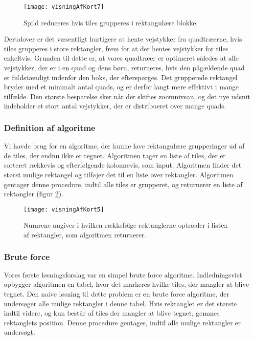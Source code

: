 \begin{figure}[h]
	\centering
	\texttt{[image: visningAfKort7]}
	\captionsetup{width=0.8\textwidth}
	\caption{Spild reduceres hvis tiles grupperes i rektangulære blokke.}
	\label{figur:visningAfKort7}
\end{figure}

Derudover er det væsentligt hurtigere at hente vejstykker fra quadtræerne, hvis tiles grupperes i store rektangler, frem for at der hentes vejstykker for tiles enkeltvis. Grunden til dette er, at vores quadtræer er optimeret således at alle vejstykker, der er i en quad og dens børn, returneres, hvis den pågældende quad er fuldstændigt indenfor den boks, der efterspørges. Det grupperede rektangel bryder med et minimalt antal quads, og er derfor langt mere effektivt i mange tilfælde. Den største besparelse sker når der skiftes zoomniveau, og det nye udsnit indeholder et stort antal vejstykker, der er distribueret over mange quads.

\subsubsection{Definition af algoritme}
\label{subsec:definitionAfAlgoritme}

Vi havde brug for en algoritme, der kunne lave rektangulære grupperinger ud af de tiles, der endnu ikke er tegnet. Algoritmen tager en liste af tiles, der er sorteret rækkevis og efterfølgende kolonnevis, som input. Algoritmen finder det størst mulige rektangel og tilføjer det til en liste over rektangler. Algoritmen gentager denne procedure, indtil alle tiles er grupperet, og returnerer en liste af rektangler (figur \ref{figur:visningAfKort5}).

\begin{figure}[h]
	\centering
	\texttt{[image: visningAfKort5]}
	\captionsetup{width=0.8\textwidth}
	\caption{Numrene angiver i hvilken rækkefølge rektanglerne optræder i listen af rektangler, som algoritmen returnerer.}
	\label{figur:visningAfKort5}
\end{figure}

\subsubsection{Brute force}
\label{subsec:bruteForce}

Vores første løsningsforslag var en simpel brute force algoritme. Indledningsvist opbygger algoritmen en tabel, hvor det markeres hvilke tiles, der mangler at blive tegnet. Den naive løsning til dette problem er en brute force algoritme, der undersøger alle mulige rektangler i denne tabel. Hvis rektanglet er det største indtil videre, og kun består af tiles der mangler at blive tegnet, gemmes rektanglets position. Denne procedure gentages, indtil alle mulige rektangler er undersøgt.

